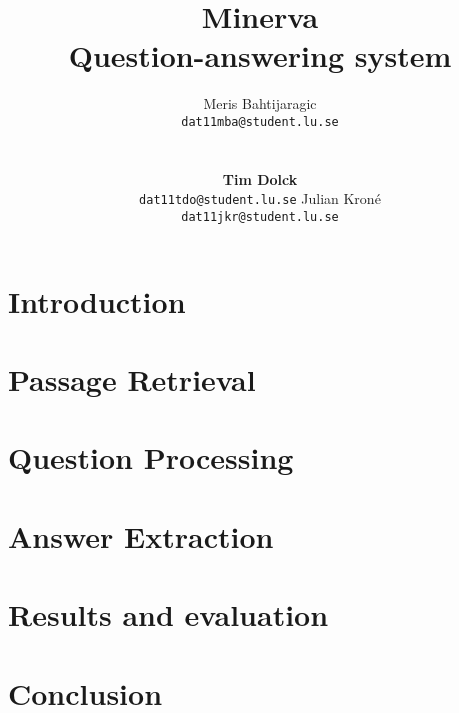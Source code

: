 \documentclass[11pt,letterpaper]{article}
\title{Minerva \\ Question-answering system}
\author{Meris Bahtijaragic\\
	    {\tt dat11mba@student.lu.se}
	    \And
      \\
      \\
      \\
      \textbf{Tim Dolck}\\
      {\tt dat11tdo@student.lu.se}
      \And
      Julian Kron\'{e}\\
      {\tt dat11jkr@student.lu.se}
}
\date{}
\begin{document}
\maketitle
\begin{abstract}

\end{abstract}
\section{Introduction}

\section{Passage Retrieval}

\section{Question Processing}

\section{Answer Extraction}

\section{Results and evaluation}

\section{Conclusion}

\end{document}
